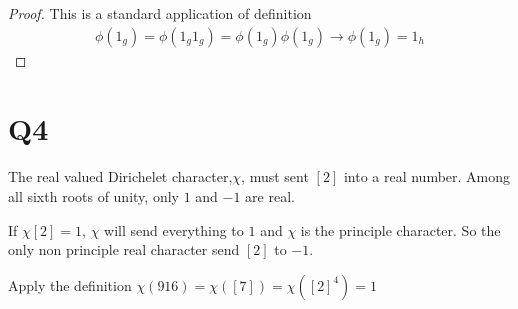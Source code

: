 \documentclass{article}
\theoremstyle{definition}
\theoremstyle{definition}
\theoremstyle{remark}
\begin{document}
\begin{proof}
	This is a standard application of definition 
	\begin{align*}
		\phi(1_g) 
		= \phi(1_g 1_g)
		= \phi(1_g) \phi(1_g) 
		\rightarrow \phi(1_g) = 1_h
	\end{align*}
\end{proof}

\section{Q4}

The real valued Dirichelet character,$\chi$, must sent $[2]$ into a real number. Among all sixth roots of unity, only $1$ and $-1$ are real.

If $\chi[2] = 1$, $\chi$ will send everything to $1$ and $\chi$ is the principle character. 
So the only non principle real character send $[2]$ to $-1$.

Apply the definition $\chi(916) = \chi ([7]) = \chi([2]^4) = 1$
\end{document}
